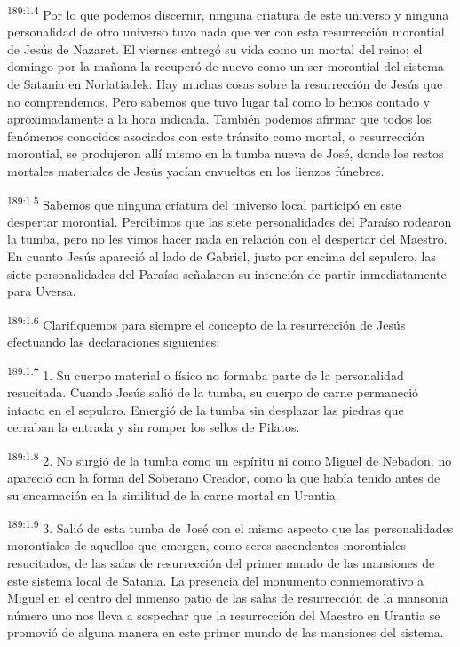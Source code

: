 \par
\textsuperscript{189:1.4} Por lo que podemos discernir, ninguna criatura de este universo y ninguna personalidad de otro universo tuvo nada que ver con esta resurrección morontial de Jesús de Nazaret. El viernes entregó su vida como un mortal del reino; el domingo por la mañana la recuperó de nuevo como un ser morontial del sistema de Satania en Norlatiadek. Hay muchas cosas sobre la resurrección de Jesús que no comprendemos. Pero sabemos que tuvo lugar tal como lo hemos contado y aproximadamente a la hora indicada. También podemos afirmar que todos los fenómenos conocidos asociados con este tránsito como mortal, o resurrección morontial, se produjeron allí mismo en la tumba nueva de José, donde los restos mortales materiales de Jesús yacían envueltos en los lienzos fúnebres.

\par
\textsuperscript{189:1.5} Sabemos que ninguna criatura del universo local participó en este despertar morontial. Percibimos que las siete personalidades del Paraíso rodearon la tumba, pero no les vimos hacer nada en relación con el despertar del Maestro. En cuanto Jesús apareció al lado de Gabriel, justo por encima del sepulcro, las siete personalidades del Paraíso señalaron su intención de partir inmediatamente para Uversa.

\par
\textsuperscript{189:1.6} Clarifiquemos para siempre el concepto de la resurrección de Jesús efectuando las declaraciones siguientes:

\par
\textsuperscript{189:1.7} 1. Su cuerpo material o físico no formaba parte de la personalidad resucitada. Cuando Jesús salió de la tumba, su cuerpo de carne permaneció intacto en el sepulcro. Emergió de la tumba sin desplazar las piedras que cerraban la entrada y sin romper los sellos de Pilatos.

\par
\textsuperscript{189:1.8} 2. No surgió de la tumba como un espíritu ni como Miguel de Nebadon; no apareció con la forma del Soberano Creador, como la que había tenido antes de su encarnación en la similitud de la carne mortal en Urantia.

\par
\textsuperscript{189:1.9} 3. Salió de esta tumba de José con el mismo aspecto que las personalidades morontiales de aquellos que emergen, como seres ascendentes morontiales resucitados, de las salas de resurrección del primer mundo de las mansiones de este sistema local de Satania. La presencia del monumento conmemorativo a Miguel en el centro del inmenso patio de las salas de resurrección de la mansonia número uno nos lleva a sospechar que la resurrección del Maestro en Urantia se promovió de alguna manera en este primer mundo de las mansiones del sistema.

